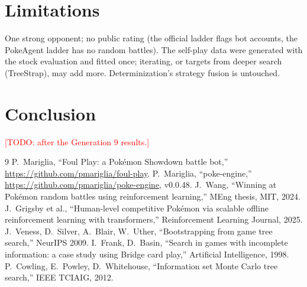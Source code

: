 \documentclass[conference]{IEEEtran}
\newcommand{\todo}[1]{\textcolor{red}{[TODO: #1]}}
\begin{document}
\section{Limitations}
One strong opponent; no public rating (the official ladder flags bot accounts, the PokeAgent ladder has no random
battles). The self-play data were generated with the stock evaluation and fitted once; iterating, or targets from
deeper search (TreeStrap), may add more. Determinization's strategy fusion is untouched.

\section{Conclusion}
\todo{after the Generation 9 results.}


\begin{thebibliography}{9}
 P.~Mariglia, ``Foul Play: a Pok\'emon Showdown battle bot,'' \url{https://github.com/pmariglia/foul-play}.
 P.~Mariglia, ``poke-engine,'' \url{https://github.com/pmariglia/poke-engine}, v0.0.48.
 J.~Wang, ``Winning at Pok\'emon random battles using reinforcement learning,'' MEng thesis, MIT, 2024.
 J.~Grigsby et al., ``Human-level competitive Pok\'emon via scalable offline reinforcement learning with transformers,'' Reinforcement Learning Journal, 2025.
 J.~Veness, D.~Silver, A.~Blair, W.~Uther, ``Bootstrapping from game tree search,'' NeurIPS 2009.
 I.~Frank, D.~Basin, ``Search in games with incomplete information: a case study using Bridge card play,'' Artificial Intelligence, 1998.
 P.~Cowling, E.~Powley, D.~Whitehouse, ``Information set Monte Carlo tree search,'' IEEE TCIAIG, 2012.
\end{thebibliography}
\end{document}
